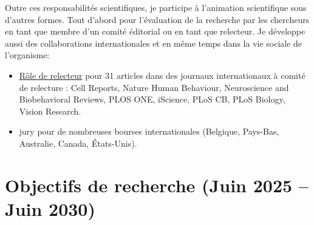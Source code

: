 \documentclass[10pt,french,a4paper]{article}%
\begin{document}


Outre ces responsabilités scientifiques, je participe à l'animation scientifique sous d'autres formes. Tout d'abord pour l'évaluation de la recherche par les chercheurs en tant que membre d'un comité éditorial ou en tant que relecteur. Je développe aussi des collaborations internationales et en même temps dans la vie sociale de l'organisme:

\begin{itemize}
	\item \href{https://orcid.org/my-orcid?orcid=0000-0002-9536-010X}{Rôle de relecteur} pour 31 articles dans des journaux internationaux à comité de relecture : Cell Reports, Nature Human Behaviour, Neuroscience and Biobehavioral Reviews, PLOS ONE, iScience, PLoS CB, PLoS Biology, Vision Research.

	\item jury pour de nombreuses bourses internationales (Belgique, Pays-Bas, Australie, Canada, États-Unis).


\end{itemize}

\newpage
\section{Objectifs de recherche (Juin 2025 -- Juin 2030)}

\end{document}
